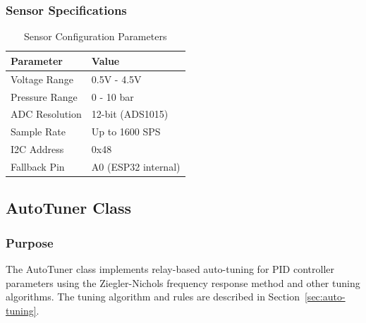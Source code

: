 \subsubsection{Sensor Specifications}
\begin{table}[H]
\centering
\begin{tabular}{@{}ll@{}}
\toprule
\textbf{Parameter} & \textbf{Value} \\
\midrule
Voltage Range & 0.5V - 4.5V \\
Pressure Range & 0 - 10 bar \\
ADC Resolution & 12-bit (ADS1015) \\
Sample Rate & Up to 1600 SPS \\
I2C Address & 0x48 \\
Fallback Pin & A0 (ESP32 internal) \\
\bottomrule
\end{tabular}
\caption{Sensor Configuration Parameters}
\end{table}

\subsection{AutoTuner Class}

\subsubsection{Purpose}
The AutoTuner class implements relay-based auto-tuning for PID controller parameters using the Ziegler-Nichols frequency response method and other tuning algorithms. The tuning algorithm and rules are described in Section~\ref{sec:auto-tuning}.

